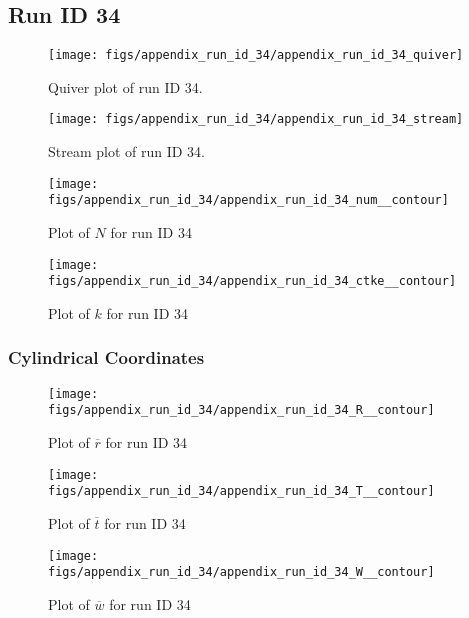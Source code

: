\subsection{Run ID 34}
\begin{figure}[H]
\centering
\texttt{[image: figs/appendix\_run\_id\_34/appendix\_run\_id\_34\_quiver]}
\caption{Quiver plot of run ID 34.}
\label{fig:appendix_run_id_34_quiver}
\end{figure}


\begin{figure}[H]
\centering
\texttt{[image: figs/appendix\_run\_id\_34/appendix\_run\_id\_34\_stream]}
\caption{Stream plot of run ID 34.}
\label{fig:appendix_run_id_34_stream}
\end{figure}


\begin{figure}[H]
\centering
\texttt{[image: figs/appendix\_run\_id\_34/appendix\_run\_id\_34\_num\_\_contour]}
\caption{Plot of $N$ for run ID 34}
\label{fig:appendix_run_id_34_num__contour}
\end{figure}


\begin{figure}[H]
\centering
\texttt{[image: figs/appendix\_run\_id\_34/appendix\_run\_id\_34\_ctke\_\_contour]}
\caption{Plot of $k$ for run ID 34}
\label{fig:appendix_run_id_34_ctke__contour}
\end{figure}


\subsubsection{Cylindrical Coordinates}
\begin{figure}[H]
\centering
\texttt{[image: figs/appendix\_run\_id\_34/appendix\_run\_id\_34\_R\_\_contour]}
\caption{Plot of $\overline{r}$ for run ID 34}
\label{fig:appendix_run_id_34_R__contour}
\end{figure}


\begin{figure}[H]
\centering
\texttt{[image: figs/appendix\_run\_id\_34/appendix\_run\_id\_34\_T\_\_contour]}
\caption{Plot of $\overline{t}$ for run ID 34}
\label{fig:appendix_run_id_34_T__contour}
\end{figure}


\begin{figure}[H]
\centering
\texttt{[image: figs/appendix\_run\_id\_34/appendix\_run\_id\_34\_W\_\_contour]}
\caption{Plot of $\overline{w}$ for run ID 34}
\label{fig:appendix_run_id_34_W__contour}
\end{figure}



